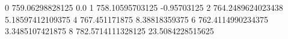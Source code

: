 0 759.06298828125 0.0
1 758.10595703125 -0.95703125
2 764.2489624023438 5.18597412109375
4 767.451171875 8.38818359375
6 762.4114990234375 3.3485107421875
8 782.5714111328125 23.5084228515625
